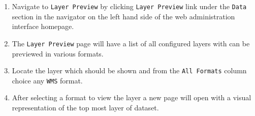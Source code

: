 

\begin{enumerate}
	\item Navigate to \lstinline|Layer Preview| by clicking \lstinline|Layer Preview| link under the \lstinline|Data| section in the navigator on the left hand side of the web administration interface homepage.
	\item The \lstinline|Layer Preview| page will have a list of all configured layers with can be previewed in various formats.
	\item Locate the layer which should be shown and from the \lstinline|All Formats| column choice any \lstinline|WMS| format.
	\item After selecting a format to view the layer a new page will open with a visual representation of the top most layer of dataset.
\end{enumerate}


